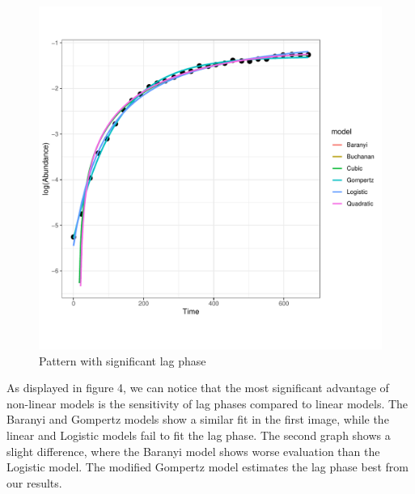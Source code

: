 \documentclass[11pt, oneside]{article}
\begin{document}
\begin{figure}[H]
\begin{center}
\begin{minipage}{.5\textwidth}
				\includegraphics[page=118, scale = 0.5]{plot_subsets.pdf}
			\end{minipage}
			\end{center}
		\caption{Pattern with significant lag phase}
		\end{figure}
		
		\noindent As displayed in figure 4, we can notice that the most significant advantage of non-linear models is the sensitivity of lag phases compared to linear models. The Baranyi and Gompertz models show a similar fit in the first image, while the linear and Logistic models fail to fit the lag phase. The second graph shows a slight difference, where the Baranyi model shows worse evaluation than the Logistic model. The modified Gompertz model estimates the lag phase best from our results.
\end{document}
